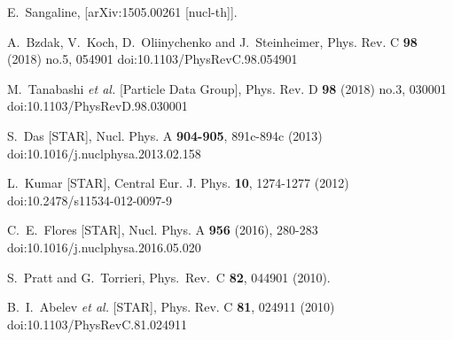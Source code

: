 \begin{thebibliography}{99}
E.~Sangaline,
[arXiv:1505.00261 [nucl-th]].

A.~Bzdak, V.~Koch, D.~Oliinychenko and J.~Steinheimer,
Phys. Rev. C \textbf{98} (2018) no.5, 054901
doi:10.1103/PhysRevC.98.054901


M.~Tanabashi \textit{et al.} [Particle Data Group],
Phys. Rev. D \textbf{98} (2018) no.3, 030001
doi:10.1103/PhysRevD.98.030001


S.~Das [STAR],
Nucl. Phys. A \textbf{904-905}, 891c-894c (2013)
doi:10.1016/j.nuclphysa.2013.02.158

L.~Kumar [STAR],
Central Eur. J. Phys. \textbf{10}, 1274-1277 (2012)
doi:10.2478/s11534-012-0097-9

C.~E.~Flores [STAR],
Nucl. Phys. A \textbf{956} (2016), 280-283
doi:10.1016/j.nuclphysa.2016.05.020

%
  S.~Pratt and G.~Torrieri,
  Phys.\ Rev.\ C {\bf 82}, 044901 (2010).
	
B.~I.~Abelev \textit{et al.} [STAR],
Phys. Rev. C \textbf{81}, 024911 (2010)
doi:10.1103/PhysRevC.81.024911


\end{thebibliography}
